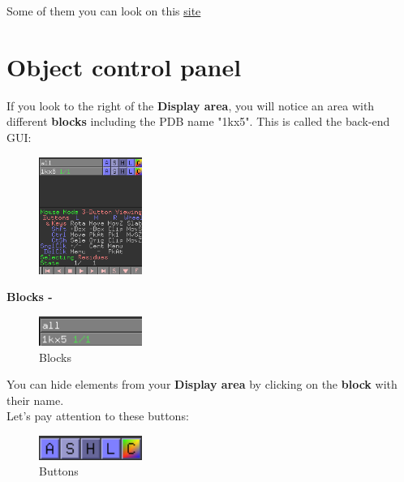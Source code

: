 \documentclass{article}
\begin{document}
Some of them you can look on this \href{https://pymolwiki.org/index.php/Running_Scripts}{site}








\section{Object control panel}

If you look to the right of the \textbf{Display area}, you will notice an area with different \textbf{blocks} including the PDB name "1kx5". This is called the back-end GUI: \\


\begin{figure}[h!]
    \centering
    \includegraphics[width=0.3\textwidth]{workshops/pymol/imgs/field.png}
    \caption[]{}
    \label{field}
\end{figure}


\textbf{Blocks -} \\  
\begin{figure}[h!]
    \centering
    \includegraphics[width=0.3\textwidth]{workshops/pymol/imgs/blocks.png}
    \caption[]{Blocks}
    \label{blocks}
\end{figure}




You can hide elements from your \textbf{Display area} by clicking on the \textbf{block} with their name. \\

Let's pay attention to these buttons: \\

\begin{figure}[h!]
    \centering
    \includegraphics[width=0.3\textwidth]{workshops/pymol/imgs/buttons.png}
    \caption[]{Buttons}
    \label{buttons}
\end{figure}
\end{document}
